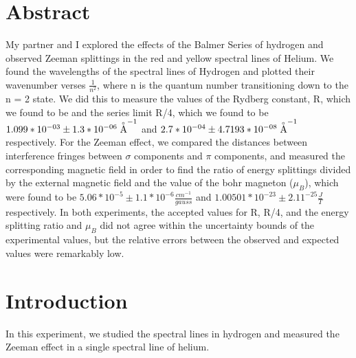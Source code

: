 \documentclass{article}
\begin{document}
\newpage


\section{Abstract}
    My partner and I explored the effects of the Balmer Series of hydrogen and observed Zeeman splittings in the red and yellow spectral lines of Helium. We found the wavelengths of the spectral lines of Hydrogen and plotted their wavenumber verses $\frac{1}{n^2}$, where n is the quantum number transitioning down to the n = 2 state. We did this to measure the values of the Rydberg constant, R, which we found to be  and the series limit R/4, which we found to be $1.099*10^{-03} \pm 1.3*10^{-06} \buildrel _\circ \over {\mathrm{A}}^{-1}$ and $2.7*10^{-04} \pm 4.7193*10^{-08} \buildrel _\circ \over {\mathrm{A}}^{-1}$ respectively. For the Zeeman effect, we compared the distances between interference fringes between $\sigma$ components and $\pi$ components, and measured the corresponding magnetic field in order to find the ratio of energy splittings divided by the external magnetic field and the value of the bohr magneton ($\mu_B$), which were found to be $5.06*10^{-5} \pm 1.1*10^{-6} \frac{cm^{-1}}{gauss}$ and $1.00501*10^{-23} \pm 2.11^{-25} \frac{J}{T}$ respectively. In both experiments, the accepted values for R, R/4, and the energy splitting ratio and $\mu_B$ did not agree within the uncertainty bounds of the experimental values, but the relative errors between the observed and expected values were remarkably low.


\section{Introduction}
    In this experiment, we studied the spectral lines in hydrogen and measured the Zeeman effect in a single spectral line of helium.\\
\end{document}
